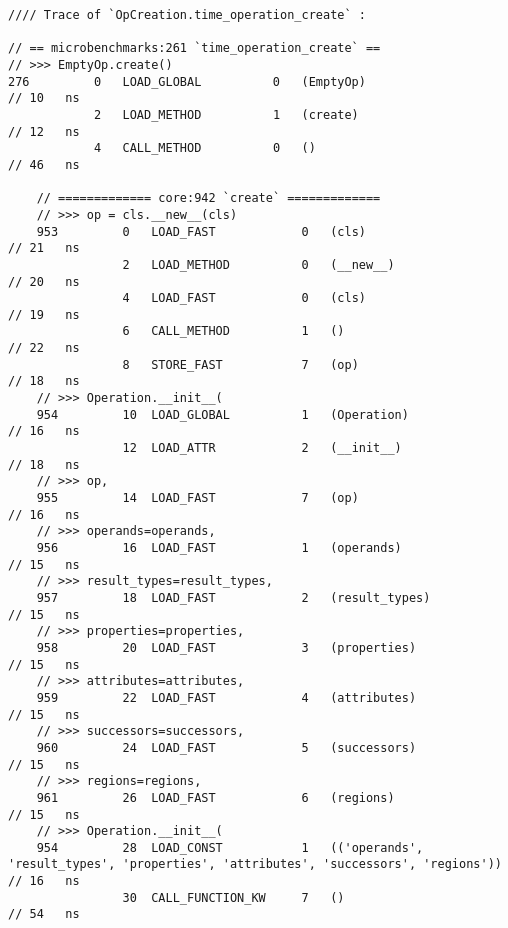 \vspace{2em}
\begin{code}
    \begin{verbatim}
//// Trace of `OpCreation.time_operation_create` :

// == microbenchmarks:261 `time_operation_create` ==
// >>> EmptyOp.create()
276         0   LOAD_GLOBAL          0   (EmptyOp)                                                  // 10   ns
            2   LOAD_METHOD          1   (create)                                                   // 12   ns
            4   CALL_METHOD          0   ()                                                         // 46   ns

    // ============= core:942 `create` =============
    // >>> op = cls.__new__(cls)
    953         0   LOAD_FAST            0   (cls)                                                  // 21   ns
                2   LOAD_METHOD          0   (__new__)                                              // 20   ns
                4   LOAD_FAST            0   (cls)                                                  // 19   ns
                6   CALL_METHOD          1   ()                                                     // 22   ns
                8   STORE_FAST           7   (op)                                                   // 18   ns
    // >>> Operation.__init__(
    954         10  LOAD_GLOBAL          1   (Operation)                                            // 16   ns
                12  LOAD_ATTR            2   (__init__)                                             // 18   ns
    // >>> op,
    955         14  LOAD_FAST            7   (op)                                                   // 16   ns
    // >>> operands=operands,
    956         16  LOAD_FAST            1   (operands)                                             // 15   ns
    // >>> result_types=result_types,
    957         18  LOAD_FAST            2   (result_types)                                         // 15   ns
    // >>> properties=properties,
    958         20  LOAD_FAST            3   (properties)                                           // 15   ns
    // >>> attributes=attributes,
    959         22  LOAD_FAST            4   (attributes)                                           // 15   ns
    // >>> successors=successors,
    960         24  LOAD_FAST            5   (successors)                                           // 15   ns
    // >>> regions=regions,
    961         26  LOAD_FAST            6   (regions)                                              // 15   ns
    // >>> Operation.__init__(
    954         28  LOAD_CONST           1   (('operands', 'result_types', 'properties', 'attributes', 'successors', 'regions'))  // 16   ns
                30  CALL_FUNCTION_KW     7   ()                                                     // 54   ns


\end{verbatim}
\end{code}
